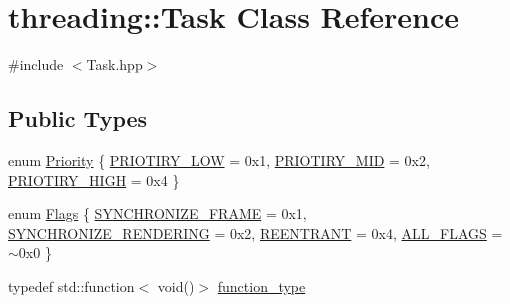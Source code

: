 \hypertarget{classthreading_1_1Task}{\section{threading\-:\-:Task Class Reference}
\label{classthreading_1_1Task}
}


{\ttfamily \#include $<$Task.\-hpp$>$}

\subsection*{Public Types}
\begin{DoxyCompactItemize}
\item 
enum \hyperlink{classthreading_1_1Task_a0c239195601479ba244066b363d633a0}{Priority} \{ \hyperlink{classthreading_1_1Task_a0c239195601479ba244066b363d633a0a539022ef4e0636092d2b2f13a404c63a}{P\-R\-I\-O\-T\-I\-R\-Y\-\_\-\-L\-O\-W} = 0x1, 
\hyperlink{classthreading_1_1Task_a0c239195601479ba244066b363d633a0ac3bcddc024351a5ce91042efc75397a7}{P\-R\-I\-O\-T\-I\-R\-Y\-\_\-\-M\-I\-D} = 0x2, 
\hyperlink{classthreading_1_1Task_a0c239195601479ba244066b363d633a0ab53fd996527a1d8b5c254dc054d71ff8}{P\-R\-I\-O\-T\-I\-R\-Y\-\_\-\-H\-I\-G\-H} = 0x4
 \}
\item 
enum \hyperlink{classthreading_1_1Task_a06b9fed2b0053a677b772b77a2932664}{Flags} \{ \hyperlink{classthreading_1_1Task_a06b9fed2b0053a677b772b77a2932664a5928df6c808948dd5ec4292386222d76}{S\-Y\-N\-C\-H\-R\-O\-N\-I\-Z\-E\-\_\-\-F\-R\-A\-M\-E} = 0x1, 
\hyperlink{classthreading_1_1Task_a06b9fed2b0053a677b772b77a2932664a397aa7b611fc612e3c8fe2ee4ee36c02}{S\-Y\-N\-C\-H\-R\-O\-N\-I\-Z\-E\-\_\-\-R\-E\-N\-D\-E\-R\-I\-N\-G} = 0x2, 
\hyperlink{classthreading_1_1Task_a06b9fed2b0053a677b772b77a2932664a2e2a58636faa031f9533a79ac31e6323}{R\-E\-E\-N\-T\-R\-A\-N\-T} = 0x4, 
\hyperlink{classthreading_1_1Task_a06b9fed2b0053a677b772b77a2932664a4e41e986aa1f84b1557357ddd696d74d}{A\-L\-L\-\_\-\-F\-L\-A\-G\-S} = $\sim$0x0
 \}
\item 
typedef std\-::function$<$ void()$>$ \hyperlink{classthreading_1_1Task_a3ea6eaa0c40c022d11aba7b852729ffe}{function\-\_\-type}
\end{DoxyCompactItemize}
